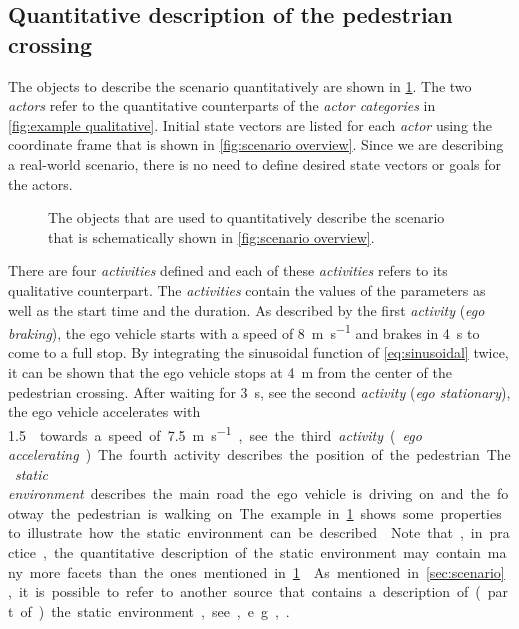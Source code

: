 \subsection{Quantitative description of the pedestrian crossing}
\label{sec:example quantitative}

The objects to describe the scenario quantitatively are shown in \cref{fig:example quantitative}. The two \textit{actors} refer to the quantitative counterparts of the \textit{actor categories} in \cref{fig:example qualitative}. Initial \cstart state vectors \cend are listed for each \textit{actor} using the coordinate frame that is shown in \cref{fig:scenario overview}. 
Since we are describing a real-world scenario, there is no need to define desired \cstart state vectors \cend or goals for the actors.


\begin{figure}
	\centering
	
	\caption{The objects that are used to quantitatively describe the scenario that is schematically shown in \cref{fig:scenario overview}.}
	\label{fig:example quantitative}
\end{figure}

There are four \textit{activities} defined and each of these \textit{activities} refers to its qualitative counterpart. The \textit{activities} contain the values of the parameters as well as the start time and the duration. As described by the first \textit{activity} (\emph{ego braking}), the ego vehicle starts with a speed of \SI{8}{\meter\per\second} and brakes in \SI{4}{\second} to come to a full stop. By integrating the sinusoidal function of \cref{eq:sinusoidal} twice, it can be shown that the ego vehicle stops at \SI{4}{\meter} from the center of the pedestrian crossing. After waiting for \SI{3}{\second}, see the second \textit{activity} (\emph{ego stationary}), the ego vehicle accelerates with \SI{1.5}{\meter\per\second\square} towards a speed of \SI{7.5}{\meter\per\second}, see the third \textit{activity} (\emph{ego accelerating}). The fourth activity describes the position of the pedestrian.

The \textit{static environment} describes the main road the ego vehicle is driving on and the footway the pedestrian is walking on. The example in \cref{fig:example quantitative} shows some properties to illustrate how the static environment can be described. \cstart Note that, in practice, the quantitative description of the static environment may contain many more facets than the ones mentioned in \cref{fig:example quantitative}. \cend As mentioned in \cref{sec:scenario}, it is possible to refer to another source that contains a description of (part of) the static environment, see, e.g., \autocite{dupuis2010opendrive}. 

